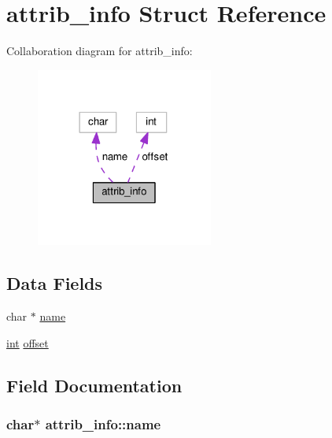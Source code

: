 \hypertarget{structattrib__info}{}\section{attrib\+\_\+info Struct Reference}
\label{structattrib__info}


Collaboration diagram for attrib\+\_\+info\+:
\nopagebreak
\begin{figure}[H]
\begin{center}
\leavevmode
\includegraphics[width=165pt]{structattrib__info__coll__graph}
\end{center}
\end{figure}
\subsection*{Data Fields}
\begin{DoxyCompactItemize}
\item 
char $\ast$ \hyperlink{structattrib__info_a50e6ac60a5bfb1c08c19c1c5f639ed20}{name}
\item 
\hyperlink{pcre_8txt_a42dfa4ff673c82d8efe7144098fbc198}{int} \hyperlink{structattrib__info_a38df5936462a697603cf95588172ba66}{offset}
\end{DoxyCompactItemize}


\subsection{Field Documentation}
\subsubsection[{\texorpdfstring{name}{name}}]{\setlength{\rightskip}{0pt plus 5cm}char$\ast$ attrib\+\_\+info\+::name}\hypertarget{structattrib__info_a50e6ac60a5bfb1c08c19c1c5f639ed20}{}\label{structattrib__info_a50e6ac60a5bfb1c08c19c1c5f639ed20}
